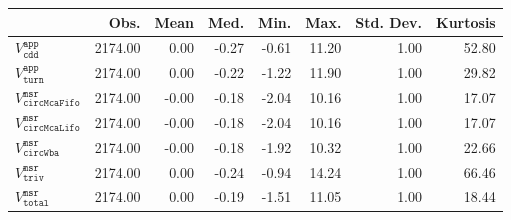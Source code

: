 \begin{tabular}{lrrrrrrr}
  \hline
 & Obs. & Mean & Med. & Min. & Max. & Std. Dev. & Kurtosis \\ 
  \hline
$V^{\mathtt{app}}_{\mathtt{cdd}}$ & 2174.00 & 0.00 & -0.27 & -0.61 & 11.20 & 1.00 & 52.80 \\ 
  $V^{\mathtt{app}}_{\mathtt{turn}}$ & 2174.00 & 0.00 & -0.22 & -1.22 & 11.90 & 1.00 & 29.82 \\ 
  $V^{\mathtt{msr}}_{\mathtt{circMcaFifo}}$ & 2174.00 & -0.00 & -0.18 & -2.04 & 10.16 & 1.00 & 17.07 \\ 
  $V^{\mathtt{msr}}_{\mathtt{circMcaLifo}}$ & 2174.00 & -0.00 & -0.18 & -2.04 & 10.16 & 1.00 & 17.07 \\ 
  $V^{\mathtt{msr}}_{\mathtt{circWba}}$ & 2174.00 & -0.00 & -0.18 & -1.92 & 10.32 & 1.00 & 22.66 \\ 
  $V^{\mathtt{msr}}_{\mathtt{triv}}$ & 2174.00 & 0.00 & -0.24 & -0.94 & 14.24 & 1.00 & 66.46 \\ 
  $V^{\mathtt{msr}}_{\mathtt{total}}$ & 2174.00 & 0.00 & -0.19 & -1.51 & 11.05 & 1.00 & 18.44 \\ 
   \hline
\end{tabular}
